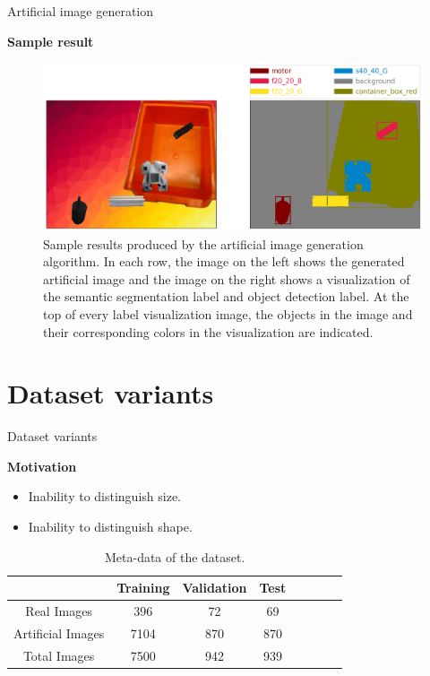 \documentclass{beamer}
\begin{document}
\begin{frame}{Artificial image generation}
	
	\textbf{Sample result}	
		
	\begin{figure}
		\centering
		\includegraphics[scale=0.26]{images/sample_result_1}
		\caption{Sample results produced by the artificial image generation algorithm. In each row, the image on the left shows the generated artificial image and the image on the right shows a visualization of the semantic segmentation label and object detection label. At the top of every label visualization image, the objects in the image and their corresponding colors in the visualization are indicated.}
		\label{Fig:sample}
	\end{figure}
\end{frame}

\section{Dataset variants}

\begin{frame}{Dataset variants}

	\textbf{Motivation}
		\begin{itemize}
			\item Inability to distinguish size.
		\end{itemize}
		
		\begin{itemize}
			\item Inability to distinguish shape.
		\end{itemize}
		
		\begin{table}
			\centering
			\begin{tabular}{|c|c|c|c|c|c|c|c|}
			\hline 
    		& Training & Validation & Test \\ 
			\hline 
			Real Images & 396 & 72 & 69 \\ 
			\hline 
			Artificial Images & 7104 & 870 & 870 \\ 
			\hline 
			Total Images & 7500 & 942 & 939 \\ 
			\hline 
			\end{tabular}
			\caption{Meta-data of the dataset.}
			\label{Table:meta}
		\end{table}

\end{frame}
\end{document}
